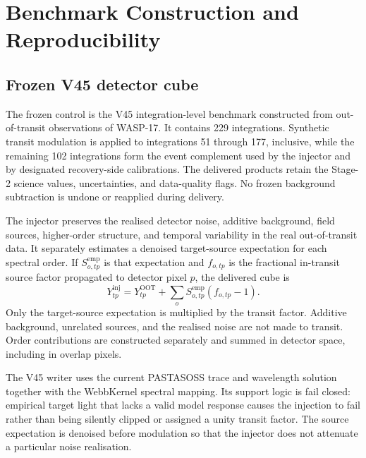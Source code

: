 \section{Benchmark Construction and Reproducibility}
\label{app:benchmarking}

\subsection{Frozen V45 detector cube}

The frozen control is the V45 integration-level benchmark constructed from
out-of-transit observations of WASP-17. It contains 229 integrations. Synthetic
transit modulation is applied to integrations 51 through 177, inclusive, while
the remaining 102 integrations form the event complement used by the injector
and by designated recovery-side calibrations. The delivered products retain the
Stage-2 science values, uncertainties, and data-quality flags. No frozen
background subtraction is undone or reapplied during delivery.

The injector preserves the realised detector noise, additive background, field
sources, higher-order structure, and temporal variability in the real
out-of-transit data. It separately estimates a denoised target-source expectation
for each spectral order. If $S^{\mathrm{emp}}_{o,tp}$ is that expectation and
$f_{o,tp}$ is the fractional in-transit source factor propagated to detector
pixel $p$, the delivered cube is
\begin{equation}
 Y^{\mathrm{inj}}_{tp}=Y^{\mathrm{OOT}}_{tp}
 +\sum_o S^{\mathrm{emp}}_{o,tp}\left(f_{o,tp}-1\right).
 \label{eq:v45-injector}
\end{equation}
Only the target-source expectation is multiplied by the transit factor.
Additive background, unrelated sources, and the realised noise are not made to
transit. Order contributions are constructed separately and summed in detector
space, including in overlap pixels.

The V45 writer uses the current PASTASOSS trace and wavelength solution together
with the WebbKernel spectral mapping. Its support logic is fail closed: empirical
target light that lacks a valid model response causes the injection to fail
rather than being silently clipped or assigned a unity transit factor. The
source expectation is denoised before modulation so that the injector does not
attenuate a particular noise realisation.

